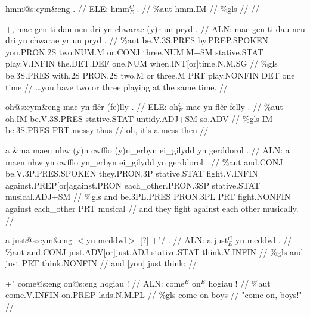 \documentclass[a4paper,10pt]{article}
\begin{document}
\ex
\begingl[lingstyle=gergl]
\glchat hmm@s:cym\&eng . //
\glsurface ELE:  hmm$^{C}_{E}$ .  //
\glauto \%aut  hmm{\scriptsize .IM}   //
\glmanual \%gls     //
\gleng  //
\endgl
\xe

\ex
\begingl[lingstyle=gergl]
\glchat +, mae gen ti dau neu dri yn chwarae (y)r un pryd . //
\glsurface ALN:  mae gen ti dau neu dri yn chwarae yr un pryd .  //
\glauto \%aut  be{\scriptsize .V.3S.PRES} by{\scriptsize .PREP.SPOKEN} you{\scriptsize .PRON.2S} two{\scriptsize .NUM.M} or{\scriptsize .CONJ} three{\scriptsize .NUM.M+SM} stative{\scriptsize .STAT} play{\scriptsize .V.INFIN} the{\scriptsize .DET.DEF} one{\scriptsize .NUM} when{\scriptsize .INT[or]time.N.M.SG}   //
\glmanual \%gls  be{\scriptsize .3S.PRES} with{\scriptsize .2S} PRON{\scriptsize .2S} two{\scriptsize .M} or three{\scriptsize .M} PRT play{\scriptsize .NONFIN} DET one time   //
\gleng  \dots you have two or three playing at the same time. //
\endgl
\xe

\ex
\begingl[lingstyle=gergl]
\glchat oh@s:cym\&eng mae yn flêr (fe)lly . //
\glsurface ELE:  oh$^{C}_{E}$ mae yn flêr felly .  //
\glauto \%aut  oh{\scriptsize .IM} be{\scriptsize .V.3S.PRES} stative{\scriptsize .STAT} untidy{\scriptsize .ADJ+SM} so{\scriptsize .ADV}   //
\glmanual \%gls  IM be{\scriptsize .3S.PRES} PRT messy thus   //
\gleng oh, it's a mess then //
\endgl
\xe

\ex
\begingl[lingstyle=gergl]
\glchat a \&ma maen nhw (y)n cwffio (y)n\_erbyn ei\_gilydd yn gerddorol . //
\glsurface ALN:  a maen nhw yn cwffio yn\_erbyn ei\_gilydd yn gerddorol .  //
\glauto \%aut  and{\scriptsize .CONJ} be{\scriptsize .V.3P.PRES.SPOKEN} they{\scriptsize .PRON.3P} stative{\scriptsize .STAT} fight{\scriptsize .V.INFIN} against{\scriptsize .PREP[or]against.PRON} each\_other{\scriptsize .PRON.3SP} stative{\scriptsize .STAT} musical{\scriptsize .ADJ+SM}   //
\glmanual \%gls  and be{\scriptsize .3PL.PRES} PRON{\scriptsize .3PL} PRT fight{\scriptsize .NONFIN} against each\_other PRT musical   //
\gleng and they fight against each other musically. //
\endgl
\xe

\ex
\begingl[lingstyle=gergl]
\glchat a just@s:cym\&eng $<$yn meddwl$>$ [?] +"/ . //
\glsurface ALN:  a just$^{C}_{E}$ yn meddwl .  //
\glauto \%aut  and{\scriptsize .CONJ} just{\scriptsize .ADV[or]just.ADJ} stative{\scriptsize .STAT} think{\scriptsize .V.INFIN}   //
\glmanual \%gls  and just PRT think{\scriptsize .NONFIN}   //
\gleng and [you] just think: //
\endgl
\xe

\ex
\begingl[lingstyle=gergl]
\glchat +" come@s:eng on@s:eng hogiau ! //
\glsurface ALN:  come$^{E}$ on$^{E}$ hogiau !  //
\glauto \%aut  come{\scriptsize .V.INFIN} on{\scriptsize .PREP} lads{\scriptsize .N.M.PL}   //
\glmanual \%gls  come on boys   //
\gleng "come on, boys!" //
\endgl
\xe
\end{document}
